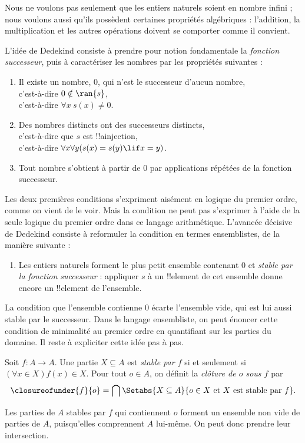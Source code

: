 \documentclass[../../../include/open-logic-section]{subfiles}
\begin{document}

Nous ne voulons pas seulement que les entiers naturels soient en nombre
infini ; nous voulons aussi qu'ils possèdent certaines propriétés
algébriques : l'addition, la multiplication et les autres opérations
doivent se comporter comme il convient.

L'idée de Dedekind consiste à prendre pour notion fondamentale la
\emph{fonction successeur}, puis à caractériser les nombres par les
propriétés suivantes :
\begin{enumerate}
	\item Il existe un nombre, $0$, qui n'est le successeur d'aucun nombre,
	\\c'est-à-dire $0 \notin \ran{s}$,
	\\c'est-à-dire $\forall x\ s(x) \neq 0$.
	\item Des nombres distincts ont des successeurs distincts,
	\\c'est-à-dire que $s$ est !!a{injection},
	\\c'est-à-dire $\forall x \forall y (s(x) = s(y) \lif x = y)$.
	\item{} Tout nombre s'obtient à partir de
	$0$ par applications répétées de la fonction successeur.
\end{enumerate}
Les deux premières conditions s'expriment aisément en logique du premier
ordre, comme on vient de le voir. Mais la condition
 ne peut pas s'exprimer à l'aide de la seule
logique du premier ordre dans ce langage arithmétique. L'avancée décisive
de Dedekind consiste à reformuler la condition
 en termes ensemblistes, de la manière suivante :
\begin{enumerate}
	\item[3$'$.] Les entiers naturels forment le plus petit ensemble
	contenant $0$ et \emph{stable par la fonction successeur} :
	appliquer $s$ à un !!{element} de cet ensemble donne encore
	un !!{element} de l'ensemble.
\end{enumerate}
La condition que l'ensemble contienne $0$ écarte l'ensemble vide,
qui est lui aussi stable par le successeur. Dans le langage ensembliste,
on peut énoncer cette condition de minimalité au premier ordre en
quantifiant sur les parties du domaine. Il reste à expliciter cette
idée pas à pas.
%

\begin{defn}
	Soit $f\colon A\to A$. Une partie $X\subseteq A$ est
	\emph{stable par $f$} si et seulement si
	$(\forall x \in X)f(x) \in X$. Pour tout $o\in A$, on définit la
	\emph{clôture de $o$ sous $f$} par
	$$\closureofunder{f}{o} = \bigcap\Setabs{X\subseteq A}{o \in X\text{ et }X
\text{ est stable par }f}.$$
\end{defn}
Les parties de $A$ stables par $f$ qui contiennent $o$ forment
un ensemble non vide de parties de $A$, puisqu'elles comprennent $A$
lui-même. On peut donc prendre leur intersection.
%
\end{document}
